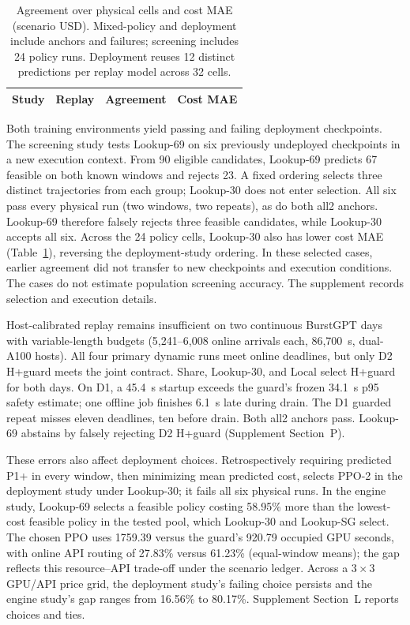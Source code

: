 \begin{table}[t]
\centering
\small
\caption{Agreement over physical cells and cost MAE (scenario USD).
Mixed-policy and deployment include anchors and failures; screening includes 24 policy runs.
Deployment reuses 12 distinct predictions per replay model across 32 cells.}
\label{tab:crosscampaign}
\setlength{\tabcolsep}{3pt}
\par\vspace{4pt}
\begin{tabular*}{\linewidth}{@{\extracolsep{\fill}}llrr@{}}
\toprule
Study & Replay & Agreement & Cost MAE\\
\midrule

\end{tabular*}
\end{table}

Both training environments yield passing and failing deployment checkpoints.
The screening study tests Lookup-69 on six previously undeployed checkpoints in a new execution
context. From 90 eligible candidates, Lookup-69 predicts 67 feasible on both known
windows and rejects 23. A fixed ordering selects three distinct trajectories
from each group; Lookup-30 does not enter selection. All six pass every physical
run (two windows, two repeats), as do both all2 anchors. Lookup-69 therefore falsely
rejects three feasible candidates, while Lookup-30 accepts all six. Across the 24
policy cells, Lookup-30 also has lower cost MAE (Table~\ref{tab:crosscampaign}),
reversing the deployment-study ordering. In these selected cases, earlier
agreement did not transfer to new checkpoints and execution conditions.
The cases do not estimate population screening accuracy. The supplement records selection and execution details.

Host-calibrated replay remains insufficient on two continuous BurstGPT days
with variable-length budgets (5,241--6,008 online arrivals each, 86,700~s,
dual-A100 hosts). All four primary dynamic runs meet online
deadlines, but only D2 H+guard meets the joint contract. Share, Lookup-30, and
Local select H+guard for both days. On D1, a 45.4~s startup exceeds the guard's
frozen 34.1~s p95 safety estimate; one offline job finishes 6.1~s late during drain.
The D1 guarded repeat misses eleven deadlines, ten before drain. Both all2 anchors
pass. Lookup-69 abstains by falsely rejecting D2 H+guard (Supplement Section~P).

These errors also affect deployment choices. Retrospectively requiring
predicted P1+ in every window, then minimizing mean predicted cost, selects
PPO-2 in the deployment study under Lookup-30; it fails all six physical runs. In the engine study, Lookup-69 selects a
feasible policy costing 58.95\% more than the lowest-cost feasible policy
in the tested pool, which Lookup-30 and Lookup-SG select. The chosen PPO uses
1759.39 versus the guard's 920.79 occupied GPU seconds, with online API routing
of 27.83\% versus 61.23\% (equal-window means); the gap reflects this resource--API
trade-off under the scenario ledger. Across a $3\times3$ GPU/API price grid, the deployment study's failing choice persists and
the engine study's gap ranges from 16.56\% to 80.17\%.
Supplement Section~L reports choices and ties.

